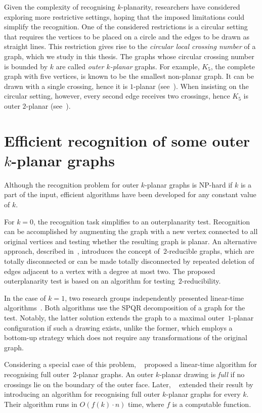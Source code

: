 Given the complexity of recognising \(k\)-planarity, researchers have considered exploring more restrictive settings, hoping that the imposed limitations could simplify the recognition. One of the considered restrictions is a circular setting that requires the vertices to be placed on a circle and the edges to be drawn as straight lines. This restriction gives rise to the \emph{circular local crossing number} of a graph, which we study in this thesis. The graphs whose circular crossing number is bounded by \(k\) are called \emph{outer \(k\)-planar} graphs. For example, \(K_5\), the complete graph with five vertices, is known to be the smallest non-planar graph. It can be drawn with a single crossing, hence it is \(1\)-planar (see~). When insisting on the circular setting, however, every second edge receives two crossings, hence \(K_5\) is outer \(2\)-planar (see~).


\section{Efficient recognition of some outer \texorpdfstring{\(k\)}{k}-planar graphs}

Although the recognition problem for outer \(k\)-planar graphs is NP-hard if \(k\) is a part of the input, efficient algorithms have been developed for any constant value of \(k\).

For \(k = 0\), the recognition task simplifies to an outerplanarity test. Recognition can be accomplished by augmenting the graph with a new vertex connected to all original vertices and testing whether the resulting graph is planar. An alternative approach, described in~\cite{linear-op}, introduces the concept of~\(2\)-reducible graphs, which are totally disconnected or can be made totally disconnected by repeated deletion of edges adjacent to a vertex with a degree at most two. The proposed outerplanarity test is based on an algorithm for testing~\(2\)-reducibility.

In the case of \(k = 1\), two research groups independently presented linear-time algorithms~\cite{linear-o1p_, linear-o1p}. Both algorithms use the SPQR decomposition of a graph for the test. Notably, the latter solution extends the graph to a maximal outer~\(1\)-planar configuration if such a drawing exists, unlike the former, which employs a bottom-up strategy which does not require any transformations of the original graph.

Considering a special case of this problem, \citeauthor{linear-full-o2p}~\cite{linear-full-o2p} proposed a linear-time algorithm for recognising full outer~\(2\)-planar graphs. An outer \(k\)-planar drawing is \emph{full} if no crossings lie on the boundary of the outer face. Later, \citeauthor{linear-full-okp}~\cite{linear-full-okp} extended their result by introducing an algorithm for recognising full outer \(k\)-planar graphs for every \(k\). Their algorithm runs in \(O(f(k) \cdot n)\) time, where \(f\) is a computable function.


